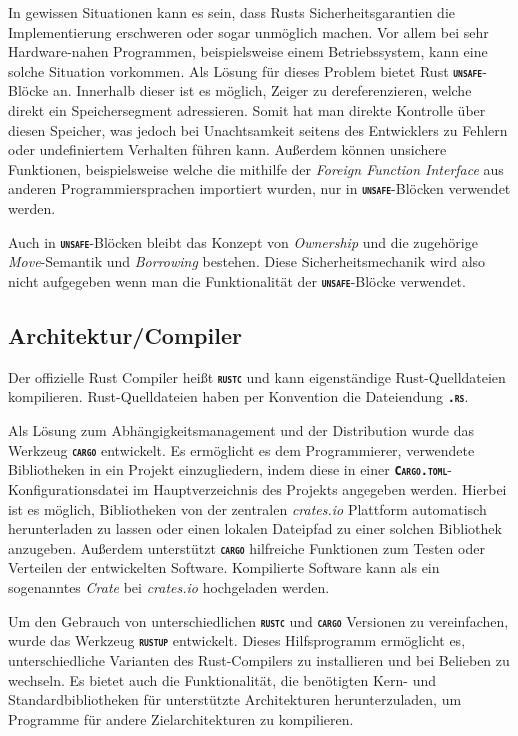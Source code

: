 In gewissen Situationen kann es sein, dass Rusts Sicherheitsgarantien die Implementierung erschweren oder
sogar unmöglich machen. Vor allem bei sehr Hardware-nahen Programmen, beispielsweise einem Betriebssystem,
kann eine solche Situation vorkommen. Als Lösung für dieses Problem bietet Rust
\texttt{\textsc{\textbf{unsafe}}}-Blöcke an. Innerhalb dieser ist es möglich, Zeiger zu dereferenzieren, welche
direkt ein Speichersegment adressieren. Somit hat man direkte Kontrolle über diesen Speicher, was
jedoch bei Unachtsamkeit seitens des Entwicklers zu Fehlern oder undefiniertem Verhalten führen kann.
Außerdem können unsichere Funktionen, beispielsweise welche die mithilfe der
\textit{Foreign Function Interface} aus anderen Programmiersprachen importiert wurden,
nur in \texttt{\textsc{\textbf{unsafe}}}-Blöcken verwendet werden.\cite{rustBook}

Auch in \texttt{\textsc{\textbf{unsafe}}}-Blöcken bleibt das Konzept von \textit{Ownership} und die zugehörige
\textit{Move}-Semantik und \textit{Borrowing} bestehen. Diese Sicherheitsmechanik wird also nicht aufgegeben
wenn man die Funktionalität der \texttt{\textsc{\textbf{unsafe}}}-Blöcke verwendet.\cite{rustBook}

\subsection{Architektur/Compiler}

Der offizielle Rust Compiler heißt \texttt{\textsc{\textbf{rustc}}} und kann eigenständige Rust-Quelldateien
kompilieren. Rust-Quelldateien haben per Konvention die Dateiendung \texttt{\textsc{\textbf{.rs}}}.\cite{rustBook}

Als Lösung zum Abhängigkeitsmanagement und der Distribution wurde das Werkzeug \texttt{\textsc{\textbf{cargo}}} 
entwickelt. Es ermöglicht es dem Programmierer, verwendete Bibliotheken in ein Projekt einzugliedern,
indem diese in einer \texttt{\textsc{\textbf{Cargo.toml}}}-Konfigurationsdatei im Hauptverzeichnis
des Projekts angegeben werden. Hierbei ist es möglich, Bibliotheken von der zentralen \textit{crates.io}
Plattform automatisch herunterladen zu lassen oder einen lokalen Dateipfad zu einer solchen
Bibliothek anzugeben.
Außerdem unterstützt \texttt{\textsc{\textbf{cargo}}} hilfreiche Funktionen zum Testen oder
Verteilen der entwickelten Software. Kompilierte Software kann als ein sogenanntes \textit{Crate} bei
\textit{crates.io} hochgeladen werden.\cite{rustBook}

Um den Gebrauch von unterschiedlichen \texttt{\textsc{\textbf{rustc}}} und \texttt{\textsc{\textbf{cargo}}} Versionen 
zu vereinfachen, wurde das Werkzeug \texttt{\textsc{\textbf{rustup}}} entwickelt. Dieses
Hilfsprogramm ermöglicht es, unterschiedliche Varianten des Rust-Compilers zu installieren und bei Belieben zu
wechseln. Es bietet auch die Funktionalität, die benötigten Kern- und Standardbibliotheken für unterstützte
Architekturen herunterzuladen, um Programme für andere Zielarchitekturen zu kompilieren.\cite{rustupRepo}

